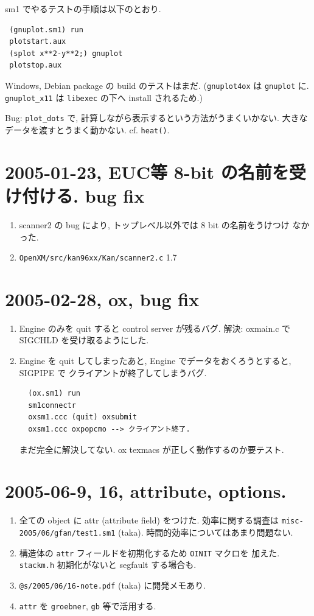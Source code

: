 \documentclass{jarticle}
\begin{document}
sm1 でやるテストの手順は以下のとおり.
\begin{verbatim}
 (gnuplot.sm1) run
 plotstart.aux
 (splot x**2-y**2;) gnuplot
 plotstop.aux
\end{verbatim}

Windows, Debian package の build のテストはまだ.
({\tt gnuplot4ox} は {\tt gnuplot} に. {\tt gnuplot\_x11} は {\tt libexec}
の下へ install されるため.)

Bug: {\tt plot\_dots} で, 計算しながら表示するという方法がうまくいかない.
大きなデータを渡すとうまく動かない. cf. {\tt heat()}.

\section{2005-01-23, EUC等 8-bit の名前を受け付ける. bug fix}
\begin{enumerate}
\item scanner2 の bug により, トップレベル以外では 8 bit の名前をうけつけ
    なかった.
\item {\tt OpenXM/src/kan96xx/Kan/scanner2.c} 1.7
\end{enumerate}

\section{2005-02-28, ox, bug fix}

\begin{enumerate}
\item Engine のみを quit  すると control server が残るバグ.
解決: oxmain.c で  SIGCHLD を受け取るようにした.
\item Engine を quit してしまったあと, Engine でデータをおくろうとすると,
SIGPIPE で クライアントが終了してしまうバグ.
\begin{verbatim}
  (ox.sm1) run
  sm1connectr
  oxsm1.ccc (quit) oxsubmit
  oxsm1.ccc oxpopcmo --> クライアント終了.
\end{verbatim}
まだ完全に解決してない. 
ox texmacs が正しく動作するのか要テスト.
\end{enumerate}

\section{2005-06-9, 16, attribute, options.}
\begin{enumerate}
\item  全ての object に attr (attribute field) をつけた.
効率に関する調査は {\tt misc-2005/06/gfan/test1.sm1} (taka).
時間的効率についてはあまり問題ない.
\item 構造体の {\tt attr} フィールドを初期化するため {\tt OINIT} マクロを
加えた. {\tt stackm.h}
初期化がないと segfault する場合も.
\item {\tt @s/2005/06/16-note.pdf} (taka) に開発メモあり.
\item {\tt attr} を {\tt groebner}, {\tt gb} 等で活用する.
\end{enumerate}
\end{document}
